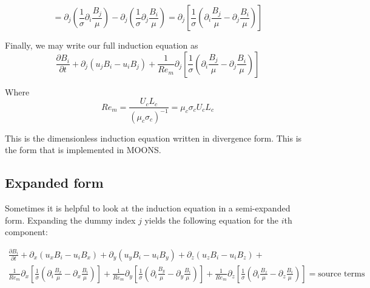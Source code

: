 \documentclass[11pt]{article}
\begin{document}
\begin{equation}
  = \partial_j \left( \frac{1}{\sigma} \partial_i \frac{B_j}{\mu} \right) 
  - \partial_j \left( \frac{1}{\sigma} \partial_j \frac{B_i}{\mu} \right)
  = \partial_j \left[ \frac{1}{\sigma} \left( \partial_i \frac{B_j}{\mu} - \partial_j \frac{B_i}{\mu} \right) \right]
\end{equation}

Finally, we may write our full induction equation as
\begin{equation}
\boxed{
\frac{\partial B_i}{\partial t} + \partial_j (u_j B_i - u_i B_j) + 
\frac{1}{Re_m}
\partial_j \left[ \frac{1}{\sigma} \left( \partial_i \frac{B_j}{\mu} - \partial_j \frac{B_i}{\mu} \right) \right]
}
\end{equation}

Where
\begin{equation}
\boxed{
Re_m = \frac{U_c L_c}{(\mu_c \sigma_c)^{-1}} = \mu_c \sigma_c U_c L_c
}
\end{equation}

This is the dimensionless induction equation written in divergence form. This is the form that is implemented in MOONS.

\subsection{Expanded form}
Sometimes it is helpful to look at the induction equation in a semi-expanded form. Expanding the dummy index $j$ yields the following equation for the $i$th component:

\begin{multline}
\frac{\partial B_i}{\partial t} + 
\partial_x (u_x B_i - u_i B_x) + 
\partial_y (u_y B_i - u_i B_y) + 
\partial_z (u_z B_i - u_i B_z) + \\
\frac{1}{Re_m}
\partial_x \left[ \frac{1}{\sigma} \left( \partial_i \frac{B_x}{\mu} - \partial_x \frac{B_i}{\mu} \right) \right] + 
\frac{1}{Re_m}
\partial_y \left[ \frac{1}{\sigma} \left( \partial_i \frac{B_y}{\mu} - \partial_y \frac{B_i}{\mu} \right) \right] + 
\frac{1}{Re_m}
\partial_z \left[ \frac{1}{\sigma} \left( \partial_i \frac{B_z}{\mu} - \partial_z \frac{B_i}{\mu} \right) \right]  = \text{source terms}
\end{multline}
\end{document}
